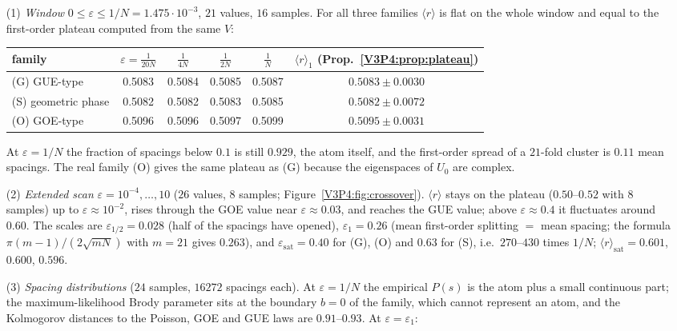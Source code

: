 \begin{remark}\label{V3P4:rem:window}
\begin{enumerate}
\item[(1)] \emph{Window} $0\le\varepsilon\le1/N=1.475\cdot10^{-3}$, $21$ values, $16$ samples. For
all three families $\langle r\rangle$ is flat on the whole window and equal to the first-order
plateau computed from the same $V$:
\begin{center}\small
\begin{tabular}{lccccc}
\toprule
family & $\varepsilon=\frac1{20N}$ & $\frac1{4N}$ & $\frac1{2N}$ & $\frac1N$ & $\langle r\rangle_1$ (Prop.~\ref{V3P4:prop:plateau})\\
\midrule
(G) GUE-type & 0.5083 & 0.5084 & 0.5085 & 0.5087 & $0.5083\pm0.0030$\\
(S) geometric phase & 0.5082 & 0.5082 & 0.5083 & 0.5085 & $0.5082\pm0.0072$\\
(O) GOE-type & 0.5096 & 0.5096 & 0.5097 & 0.5099 & $0.5095\pm0.0031$\\
\bottomrule
\end{tabular}
\end{center}
At $\varepsilon=1/N$ the fraction of spacings below $0.1$ is still $0.929$, the atom itself, and the
first-order spread of a $21$-fold cluster is $0.11$ mean spacings. The real family (O) gives the
same plateau as (G) because the eigenspaces of $U_0$ are complex.
\item[(2)] \emph{Extended scan} $\varepsilon=10^{-4},\dots,10$ ($26$ values, $8$ samples;
Figure~\ref{V3P4:fig:crossover}).
$\langle r\rangle$ stays on the plateau ($0.50$--$0.52$ with $8$ samples) up to
$\varepsilon\approx10^{-2}$, rises through the GOE value near $\varepsilon\approx0.03$, and reaches
the GUE value; above $\varepsilon\approx0.4$ it fluctuates around $0.60$. The scales are
$\varepsilon_{1/2}=0.028$ (half of the spacings have opened), $\varepsilon_1=0.26$ (mean first-order
splitting $=$ mean spacing; the formula $\pi(m-1)/(2\sqrt{mN})$ with $m=21$ gives $0.263$), and
$\varepsilon_{\mathrm{sat}}=0.40$ for (G), (O) and $0.63$ for (S), i.e.\ $270$--$430$ times $1/N$;
$\langle r\rangle_{\mathrm{sat}}=0.601$, $0.600$, $0.596$.
\item[(3)] \emph{Spacing distributions} ($24$ samples, $16272$ spacings each). At $\varepsilon=1/N$
the empirical $P(s)$ is the atom plus a small continuous part; the maximum-likelihood Brody
parameter sits at the boundary $b=0$ of the family, which cannot represent an atom, and the
Kolmogorov distances to the Poisson, GOE and GUE laws are $0.91$--$0.93$. At $\varepsilon=\varepsilon_1$:

\end{enumerate}
\end{remark}
